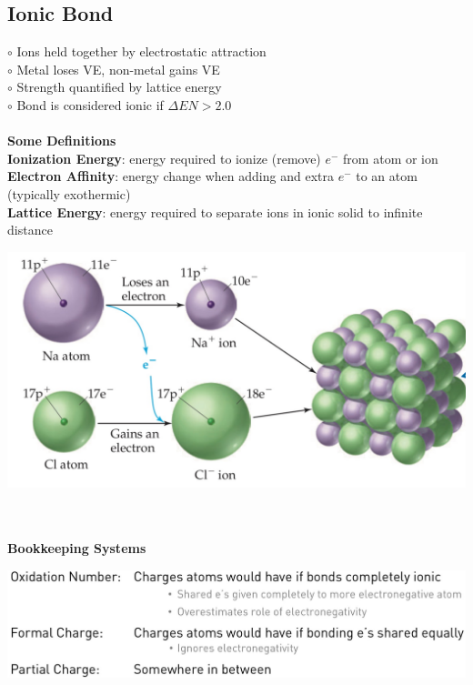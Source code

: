 \subsection{Ionic Bond}
\begin{minipage}{0.55\linewidth}
    $\circ$ Ions held together by electrostatic attraction\\
    $\circ$ Metal loses VE, non-metal gains VE\\
    $\circ$ Strength quantified by lattice energy\\
    $\circ$ Bond is considered ionic if $\Delta EN > 2.0$\\
    \vspace{1pt}\\
    \textbf{Some Definitions}\\
    \textbf{Ionization Energy}: energy required to ionize (remove) $e^-$ from atom or ion\\
    \textbf{Electron Affinity}: energy change when adding and extra $e^-$ to an atom (typically exothermic)\\
    \textbf{Lattice Energy}: energy required to separate ions in ionic solid to infinite distance 
\end{minipage}
\begin{minipage}{0.44\linewidth}
    \begin{center}
        \includegraphics[width = 0.9\linewidth]{images/NaCl.jpeg}
    \end{center}
\end{minipage}\\
\vspace{1pt}\\
\textbf{Bookkeeping Systems}\\
\begin{center}
  \includegraphics[width = 0.7\linewidth]{images/Bookkeeping_Systems.jpeg} 
\end{center}
